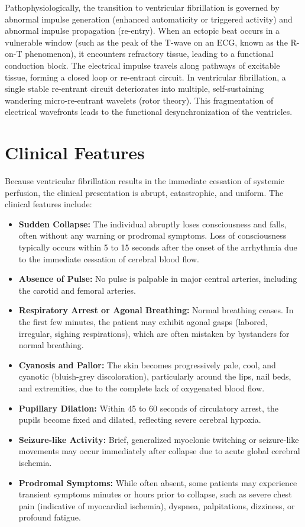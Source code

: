 Pathophysiologically, the transition to ventricular fibrillation is governed by abnormal impulse generation (enhanced automaticity or triggered activity) and abnormal impulse propagation (re-entry). When an ectopic beat occurs in a vulnerable window (such as the peak of the T-wave on an ECG, known as the R-on-T phenomenon), it encounters refractory tissue, leading to a functional conduction block. The electrical impulse travels along pathways of excitable tissue, forming a closed loop or re-entrant circuit. In ventricular fibrillation, a single stable re-entrant circuit deteriorates into multiple, self-sustaining wandering micro-re-entrant wavelets (rotor theory). This fragmentation of electrical wavefronts leads to the functional desynchronization of the ventricles.

\section*{Clinical Features}
Because ventricular fibrillation results in the immediate cessation of systemic perfusion, the clinical presentation is abrupt, catastrophic, and uniform.
The clinical features include:
\begin{itemize}
    \item \textbf{Sudden Collapse:} The individual abruptly loses consciousness and falls, often without any warning or prodromal symptoms. Loss of consciousness typically occurs within 5 to 15 seconds after the onset of the arrhythmia due to the immediate cessation of cerebral blood flow.
    \item \textbf{Absence of Pulse:} No pulse is palpable in major central arteries, including the carotid and femoral arteries.
    \item \textbf{Respiratory Arrest or Agonal Breathing:} Normal breathing ceases. In the first few minutes, the patient may exhibit agonal gasps (labored, irregular, sighing respirations), which are often mistaken by bystanders for normal breathing.
    \item \textbf{Cyanosis and Pallor:} The skin becomes progressively pale, cool, and cyanotic (bluish-grey discoloration), particularly around the lips, nail beds, and extremities, due to the complete lack of oxygenated blood flow.
    \item \textbf{Pupillary Dilation:} Within 45 to 60 seconds of circulatory arrest, the pupils become fixed and dilated, reflecting severe cerebral hypoxia.
    \item \textbf{Seizure-like Activity:} Brief, generalized myoclonic twitching or seizure-like movements may occur immediately after collapse due to acute global cerebral ischemia.
    \item \textbf{Prodromal Symptoms:} While often absent, some patients may experience transient symptoms minutes or hours prior to collapse, such as severe chest pain (indicative of myocardial ischemia), dyspnea, palpitations, dizziness, or profound fatigue.
\end{itemize}

